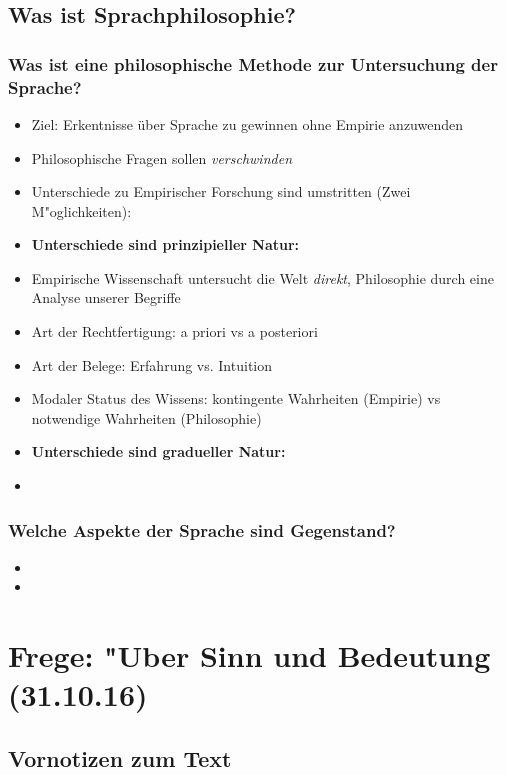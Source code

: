 \documentclass[]{scrartcl}
\begin{document}
\subsection{Was ist Sprachphilosophie?}
\subsubsection{Was ist eine philosophische Methode zur Untersuchung der Sprache?}
\begin{itemize}
  \item Ziel: Erkentnisse über Sprache zu gewinnen ohne Empirie anzuwenden
  \item Philosophische Fragen sollen \emph{verschwinden}
  \item Unterschiede zu Empirischer Forschung sind umstritten (Zwei M"oglichkeiten):
  \item \textbf{Unterschiede sind prinzipieller Natur:}
  \item Empirische Wissenschaft untersucht die Welt \emph{direkt}, Philosophie durch eine Analyse unserer Begriffe
  \item Art der Rechtfertigung: a priori vs a posteriori
  \item Art der Belege: Erfahrung vs. Intuition
  \item Modaler Status des Wissens: kontingente Wahrheiten (Empirie) vs notwendige Wahrheiten (Philosophie)
  \item \textbf{Unterschiede sind gradueller Natur:}
  \item 
\end{itemize}

\subsubsection{Welche Aspekte der Sprache sind Gegenstand?}

\begin{itemize}
  \item
  \item
\end{itemize}

\newpage



\section{Frege: "Uber Sinn und Bedeutung\\(31.10.16)}

\subsection{Vornotizen zum Text}
\end{document}
